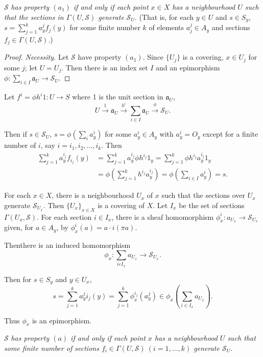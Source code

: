 $\mathscr{S}$ \textit{has property $(a_1)$ if and only if each point 
  $x \in X$ has a neighbourhood $U$ such that the sections in $\Gamma
  (U, \mathscr{S})$ generate} $\mathscr{S}_U$. (That is, for each $y
\in U$ and $s \in S_y$, $s= \sum^k_{j=1} a^j_y f_j(y)$ for some
finite number $k$ of elements $a^j_j \in A_y$ and sections $f_j \in
\Gamma (U,\mathscr{S})$.) 

\begin{proof}
{\em Necessity.} Let $\mathscr{S}$ have property $(a_1)$. Since
$\{U_j\}$ is a covering, $x \in U_j$ for some $j$; let $U =U_j$. Then
there is an index set $I$ and an epimorphism $\phi : \sum \limits_{i
  \in I} \mathfrak{a}_U \to \mathscr{S}_U$.  
\end{proof}

Let $f^i = \phi h^i 1 : U \to S$ where 1 is the unit section in
$\mathfrak{a}_U$, 
$$
U \xrightarrow {1} \mathfrak{a}_U\xrightarrow {h^i}\sum \limits_{i \in
  I} \mathfrak{a}_U \xrightarrow{\phi} \mathscr{S}_U.  
$$

Then if $s \in \mathscr{S}_U$, $s=\phi(\sum_i a^i_y)$ for some $a^i_y
\in A_y$ with $a^i_y = O_y$ except for a finite number of $i$, say
$i=i_1, i_2, \ldots, i_k$. Then  
\begin{align*}
\sum^k_{j=1} a^{i_j}_y f_{i_j}(y) & = \sum^k_{j=1} a^{i_j}_y \phi
h^{i_j}1_y = \sum^k_{j=1} \phi h^{i_j} a^{i_j}_y 1_y\\ 
& = \phi (\sum^k_{j=1} h^{i_j} a^{i_j}_y ) = \phi(\sum_{i \in I}a^i_y)
=s. 
\end{align*}

\medskip
{}
 For each $x \in X$, there is a neighbourhood $U_x$ of $x$ such that
 the sections over $U_x$ generate $\mathscr{S}_{U_x}$. Then
 $\{U_x\}_{x \in X}$ is a covering of $X$. Let $I_x$ be the set of
 sections $\Gamma (U_x, \mathscr{S})$. For each section $i \in I_x$,
 there is a sheaf homomorphism $\phi^i_x : a_{U_x} \to
 \mathscr{S}_{U_x}$ given, for $a \in A_y$, by $ \phi^i_x (a) = a\cdot
 i(\pi a)$.    

Then\pageoriginale there is an induced homomorphism
$$
\phi_x : \sum_{i \varepsilon I_x} a_{U_x} \to \mathscr{S}_{U_x}.
$$

Then for $s \in S_y$ and $y \in U_x$,
$$
s=\sum^k_{j=1} a^j_y i_j (y)= \sum^k_{j=1} \phi^{i_j}_x (a^j_y) \in
\phi_x ( \sum_{i \in I_x} a_{U_x}). 
$$

Thus $\phi_x$ is an epimorphism.

\medskip
$\mathscr{S}$ \textit{has property $(a)$ if and only if each point $x$
  has a neighbourhood $U$ such that some finite number of sections 
 $f_i \in \Gamma (U, \mathscr{S})~(i=1,\ldots,k)$  generate
$\mathscr{S}_U$.} 

